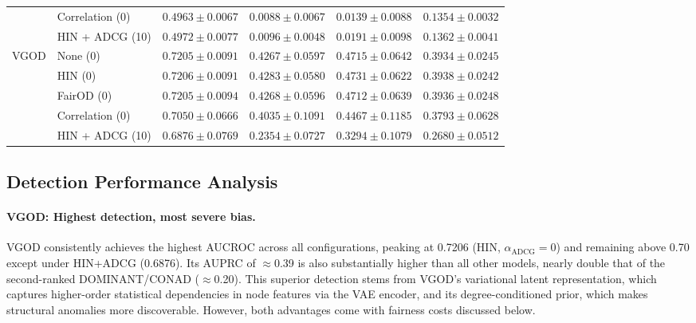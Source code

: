 \documentclass[sigconf,natbib=false]{acmart}
\begin{document}
\begin{table}[ht]
{\begin{tabular}{llcccc}
  & Correlation (0)   & $0.4963 \pm 0.0067$ & $0.0088 \pm 0.0067$ & $0.0139 \pm 0.0088$ & $0.1354 \pm 0.0032$ \\
  & HIN + ADCG (10)   & $0.4972 \pm 0.0077$ & $0.0096 \pm 0.0048$ & $0.0191 \pm 0.0098$ & $0.1362 \pm 0.0041$ \\
\midrule
\multirow{5}{*}{VGOD}
  & None (0)          & \underline{$0.7205 \pm 0.0091$} & $0.4267 \pm 0.0597$ & $0.4715 \pm 0.0642$ & \underline{$0.3934 \pm 0.0245$} \\
  & HIN (0)           & $0.7206 \pm 0.0091$ & $0.4283 \pm 0.0580$ & $0.4731 \pm 0.0622$ & $0.3938 \pm 0.0242$ \\
  & FairOD (0)        & $0.7205 \pm 0.0094$ & $0.4268 \pm 0.0596$ & $0.4712 \pm 0.0639$ & $0.3936 \pm 0.0248$ \\
  & Correlation (0)   & $0.7050 \pm 0.0666$ & $0.4035 \pm 0.1091$ & $0.4467 \pm 0.1185$ & $0.3793 \pm 0.0628$ \\
  & HIN + ADCG (10)   & $0.6876 \pm 0.0769$ & $\mathbf{0.2354 \pm 0.0727}$ & $\mathbf{0.3294 \pm 0.1079}$ & $0.2680 \pm 0.0512$ \\
\bottomrule
\end{tabular}%
}
\end{table}

\subsection{Detection Performance Analysis}

\paragraph{VGOD: Highest detection, most severe bias.}
VGOD consistently achieves the highest AUCROC across all configurations, peaking at 0.7206 (HIN, $\alpha_{\text{ADCG}} = 0$) and remaining above 0.70 except under HIN+ADCG (0.6876). Its AUPRC of $\approx$0.39 is also substantially higher than all other models, nearly double that of the second-ranked DOMINANT/CONAD ($\approx$0.20). This superior detection stems from VGOD's variational latent representation, which captures higher-order statistical dependencies in node features via the VAE encoder, and its degree-conditioned prior, which makes structural anomalies more discoverable. However, both advantages come with fairness costs discussed below.
\end{document}
